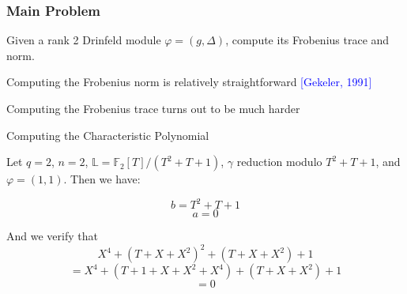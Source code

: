\documentclass{beamer}
\newcommand{\f}{\mathbb{F}}
\newcommand{\blue}{\textcolor{blue}}
\newcommand{\spa}{\vspace{0.2cm}}
\newcommand{\spa}{\textnormal{ }}
\begin{document}

\begin{frame}
\frametitle{Main Problem}

\begin{problem}
Given a rank 2 Drinfeld module $\varphi = (g,\Delta)$, compute its Frobenius trace and norm.
\end{problem}

\spa

 Computing the Frobenius norm is relatively straightforward \blue{[Gekeler, 1991]}
 
 \spa
 
 Computing the Frobenius trace turns out to be much harder

\end{frame}

\begin{frame}{Computing the Characteristic Polynomial}
\begin{example}
Let $q = 2$, $n = 2$, $\mathbb{L} = \mathbb{F}_2[T]/(T^2 + T + 1)$, $\gamma$ reduction modulo $T^2 + T + 1$, and $\varphi = (1,1)$. Then we have:

\[ b = T^2 + T +1\]
\[ a = 0\]

And we verify that
\[ X^{4} + (T + X +X^2)^2 + (T + X +X^2) + 1\]
\[ = X^{4} + (T +1 + X + X^2 + X^4) + (T + X +X^2) + 1\]
\[ = 0\]




\end{example}
\end{frame}









\end{document}
